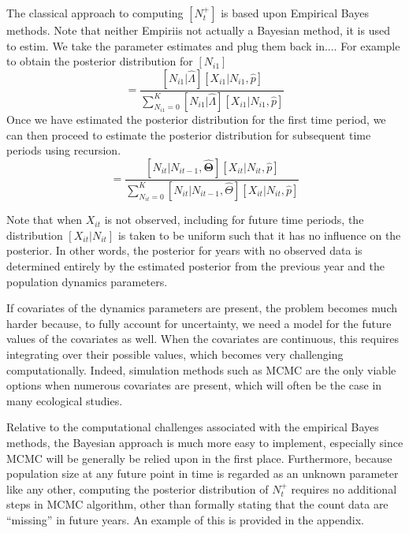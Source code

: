 \documentclass[12pt]{article}
\begin{document}
The classical approach to computing $[N^+_t]$ is based upon
Empirical Bayes methods. Note that neither Empiriis not actually a
Bayesian method, it is used to estim.
We take the parameter estimates and plug them back in.... For
example to obtain the posterior distribution for $[N_{i1}]$
\begin{equation}
[\hat{N}_{i1}] = \frac{[N_{i1}|\hat{\Lambda}][X_{i1}|N_{i1},
\hat{p}]}{\sum_{N_{i1}=0}^K
[N_{i1}|\hat{\Lambda}][X_{i1}|N_{i1},\hat{p}]}
  \label{eq:eb1}
\end{equation}
Once we have estimated the posterior distribution for the first
time period, we can then proceed to estimate the posterior
distribution for subsequent time periods using recursion.
\begin{equation}
  [\hat{N}_{it}] =
  \frac{[N_{it}|N_{it-1},\hat{\bm{\Theta}}][X_{it}|N_{it},
\hat{p}]}{\sum_{N_{it}=0}^K [N_{it}|N_{it-1},
\hat{\Theta}][X_{it}|N_{it},\hat{p}]}
  \label{eq:eb2}
\end{equation}

Note that when $X_{it}$ is not observed, including for future
time periods, the distribution $[X_{it}|N_{it}]$ is taken to be
uniform such that it has no influence on the posterior. In other words,
the posterior for years with no observed data is determined entirely
by the estimated posterior from the previous year and the
population dynamics parameters.

If covariates of the dynamics parameters are present, the problem
becomes much harder because, to fully account for uncertainty,
we need a model for the future values of the covariates as well. When
the covariates are continuous, this requires integrating over their
possible values, which becomes very challenging
computationally. Indeed, simulation methods such as MCMC are the
only viable options when numerous covariates are present, which will
often be the case in many ecological studies.

Relative to the computational challenges associated with the
empirical Bayes methods, the Bayesian approach is much more easy to
implement, especially since MCMC will be generally be relied upon in the
first place. Furthermore, because population size at any future point
in time is regarded as an unknown parameter like any other, computing the
posterior distribution of $N^+_t$ requires no additional steps
in MCMC algorithm, other than formally stating that the count data are
``missing'' in future years. An example of this is provided in the appendix.
\end{document}

